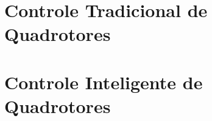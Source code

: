 %
%
\section{Controle Tradicional de Quadrotores}
\label{sec:trab-rel-tradicional}



\section{Controle Inteligente de Quadrotores}
\label{sec:trab-rel-inteligenge}



%
